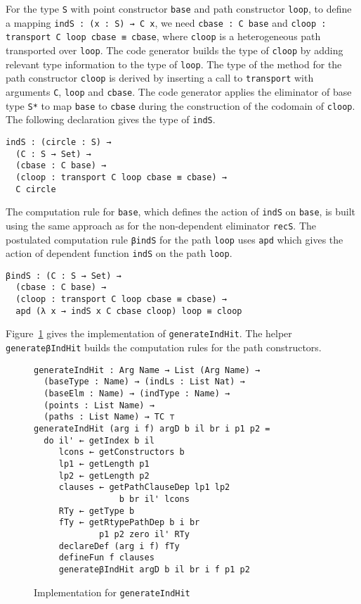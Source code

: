 \documentclass[sigplan,10pt]{acmart}
\begin{document}
For the type {\tt S} with point constructor {\tt base} and path constructor {\tt loop}, to define a mapping {\tt indS : (x : S) → C x}, we need {\tt cbase : C base} and {\tt cloop : transport C loop cbase ≡ cbase}, where {\tt cloop} is a heterogeneous path transported over {\tt loop}. The code generator builds the type of {\tt cloop} by adding relevant type information to the type of {\tt loop}.
The type of the method for the path constructor {\tt cloop} is derived by inserting a call to {\tt transport} with arguments {\tt C}, {\tt loop} and {\tt cbase}. %
The code generator applies the eliminator of base type {\tt S*} to map {\tt base} to {\tt cbase} during the construction of the codomain of {\tt cloop}. The following declaration gives the type of {\tt indS}.
\begin{center}
\begin{BVerbatim}
indS : (circle : S) → 
  (C : S → Set) →
  (cbase : C base) →
  (cloop : transport C loop cbase ≡ cbase) →
  C circle
\end{BVerbatim}
\end{center}

The computation rule for {\tt base}, which defines the action of {\tt indS} on {\tt base}, is built using the same approach as for the non-dependent eliminator {\tt recS}.
The postulated computation rule {\tt βindS} for the path {\tt loop} uses {\tt apd} which gives the action of dependent function {\tt indS} on the path {\tt loop}.
\begin{center}
\begin{BVerbatim}
βindS : (C : S → Set) → 
  (cbase : C base) → 
  (cloop : transport C loop cbase ≡ cbase) → 
  apd (λ x → indS x C cbase cloop) loop ≡ cloop
\end{BVerbatim}
\end{center}

Figure~\ref{fig:generateIndHit} gives the implementation of {\tt generateIndHit}. The helper {\tt generateβIndHit} builds the computation rules for the path constructors.

\begin{figure}
\begin{center}
\begin{Verbatim}
generateIndHit : Arg Name → List (Arg Name) →
  (baseType : Name) → (indLs : List Nat) →
  (baseElm : Name) → (indType : Name) →
  (points : List Name) → 
  (paths : List Name) → TC ⊤
generateIndHit (arg i f) argD b il br i p1 p2 =
  do il' ← getIndex b il
     lcons ← getConstructors b
     lp1 ← getLength p1
     lp2 ← getLength p2
     clauses ← getPathClauseDep lp1 lp2
                 b br il' lcons
     RTy ← getType b
     fTy ← getRtypePathDep b i br
             p1 p2 zero il' RTy
     declareDef (arg i f) fTy
     defineFun f clauses
     generateβIndHit argD b il br i f p1 p2
\end{Verbatim}
\end{center}
\caption{Implementation for {\tt generateIndHit}}
\label{fig:generateIndHit}
\end{figure}
\normalsize
\end{document}
